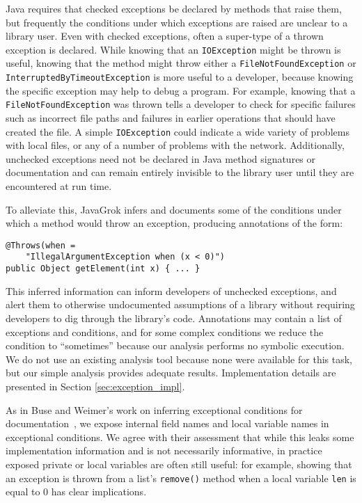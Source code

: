 Java requires that checked exceptions be declared by methods that raise them,
but frequently the conditions under which exceptions are raised are unclear to a
library user. Even with checked exceptions, often a super-type of a thrown
exception is declared.  While knowing that an \texttt{IOException} might be
thrown is useful, knowing that the method might throw either a
\texttt{FileNotFoundException} or \texttt{InterruptedByTimeoutException} is more
useful to a developer, because knowing the specific exception may help to debug
a program.  For example, knowing that a \texttt{FileNotFoundException} was thrown tells a
developer to check for specific failures such as incorrect file paths and
failures in earlier operations that should
have created the file.  A simple \texttt{IOException} could
indicate a wide variety of problems with local files, or any of a number of problems
with the network.  Additionally, unchecked exceptions need not be declared in Java method
signatures or documentation and can remain entirely invisible to the library
user until they are encountered at run time.

To alleviate this, JavaGrok infers and documents some of the conditions under which a method would
throw an exception, producing annotations of the form:

\begin{verbatim}
@Throws(when =
    "IllegalArgumentException when (x < 0)")
public Object getElement(int x) { ... }
\end{verbatim}

This inferred information can inform developers of unchecked exceptions,
and alert them to otherwise undocumented assumptions of a library without
requiring developers to dig through the library's code.
Annotations may contain a list of exceptions and conditions, and for some
complex conditions we reduce the condition to ``sometimes'' because our analysis
performs no symbolic execution.  We do not use an
existing analysis tool because none were available for this task, but our
simple analysis provides adequate results.  Implementation details are presented
in Section \ref{sec:exception_impl}.

As in Buse and Weimer's work on inferring exceptional conditions for
documentation~\cite{autodoc}, we expose internal field names and
local variable names in exceptional conditions.  We agree with their assessment
that while this leaks some
implementation information and is not necessarily informative, in practice
exposed private or local variables are often still useful: for example, showing that an exception is
thrown from a list's \texttt{remove()} method when a local variable \texttt{len}
is equal to 0 has clear implications.

